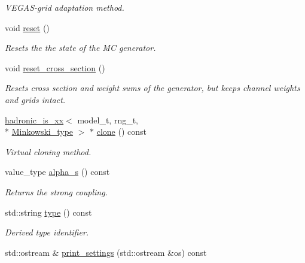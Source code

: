 \begin{DoxyCompactItemize}
\begin{DoxyCompactList}\small\item\em V\-E\-G\-A\-S-\/grid adaptation method. \end{DoxyCompactList}\item 
void \hyperlink{a00257_ac4a595e2cdbea918c39193f46b87fb25}{reset} ()
\begin{DoxyCompactList}\small\item\em Resets the the state of the M\-C generator. \end{DoxyCompactList}\item 
void \hyperlink{a00257_a87377873b0ff5cfee8e65e94844e3267}{reset\-\_\-cross\-\_\-section} ()
\begin{DoxyCompactList}\small\item\em Resets cross section and weight sums of the generator, but keeps channel weights and grids intact. \end{DoxyCompactList}\item 
\hypertarget{a00257_a3acbcfeec5ac28ec4ffbbf6c7aebfa69}{\hyperlink{a00256}{hadronic\-\_\-is\-\_\-xx}$<$ model\-\_\-t, rng\-\_\-t, \\*
\hyperlink{a00369}{Minkowski\-\_\-type} $>$ $\ast$ \hyperlink{a00257_a3acbcfeec5ac28ec4ffbbf6c7aebfa69}{clone} () const }\label{a00257_a3acbcfeec5ac28ec4ffbbf6c7aebfa69}

\begin{DoxyCompactList}\small\item\em Virtual cloning method. \end{DoxyCompactList}\item 
\hypertarget{a00257_a4f937cd0321590bffdc1fee47f011fbb}{value\-\_\-type \hyperlink{a00257_a4f937cd0321590bffdc1fee47f011fbb}{alpha\-\_\-s} () const }\label{a00257_a4f937cd0321590bffdc1fee47f011fbb}

\begin{DoxyCompactList}\small\item\em Returns the strong coupling. \end{DoxyCompactList}\item 
\hypertarget{a00257_a500b5a0a7febf4c0b500c1793e9993ae}{std\-::string \hyperlink{a00257_a500b5a0a7febf4c0b500c1793e9993ae}{type} () const }\label{a00257_a500b5a0a7febf4c0b500c1793e9993ae}

\begin{DoxyCompactList}\small\item\em Derived type identifier. \end{DoxyCompactList}\item 
\hypertarget{a00257_ae4d7ac1b77a4ccfa09c10ca286d0d7b2}{std\-::ostream \& \hyperlink{a00257_ae4d7ac1b77a4ccfa09c10ca286d0d7b2}{print\-\_\-settings} (std\-::ostream \&os) const }\label{a00257_ae4d7ac1b77a4ccfa09c10ca286d0d7b2}


\end{DoxyCompactItemize}
